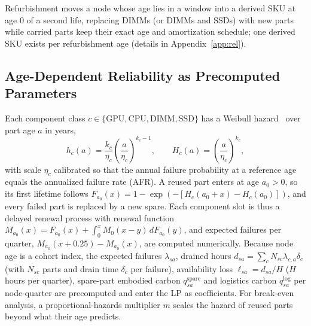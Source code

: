 \documentclass{article} %
\begin{document}
Refurbishment moves a node whose age lies in a window into a derived SKU at age 0 of a second life, replacing DIMMs (or DIMMs and SSDs) with new parts while carried parts keep their exact age and amortization schedule; one derived SKU exists per refurbishment age (details in Appendix~\ref{app:rel}).

\subsection{Age-Dependent Reliability as Precomputed Parameters}
\label{sec:method_rel}
Each component class $c \in \{\text{GPU}, \text{CPU}, \text{DIMM}, \text{SSD}\}$ has a Weibull hazard~\citep{Weibull1951StatisticalDistribution} over part age $a$ in years,
\begin{equation}
h_c(a) = \frac{k_c}{\eta_c}\left(\frac{a}{\eta_c}\right)^{k_c-1}, \qquad H_c(a) = \left(\frac{a}{\eta_c}\right)^{k_c},
\label{eq:weibull}
\end{equation}
with scale $\eta_c$ calibrated so that the annual failure probability at a reference age equals the annualized failure rate (AFR). A reused part enters at age $a_0>0$, so its first lifetime follows $F_{a_0}(x) = 1 - \exp(-[H_c(a_0+x) - H_c(a_0)])$, and every failed part is replaced by a new spare. Each component slot is thus a delayed renewal process with renewal function $M_{a_0}(x) = F_{a_0}(x) + \int_0^x M_0(x-y)\,dF_{a_0}(y)$, and expected failures per quarter, $M_{a_0}(x+0.25) - M_{a_0}(x)$, are computed numerically. Because node age is a cohort index, the expected failures $\lambda_{sa}$, drained hours $d_{sa} = \sum_c N_{sc}\lambda_{c,a}\delta_c$ (with $N_{sc}$ parts and drain time $\delta_c$ per failure), availability loss $\ell_{sa} = d_{sa}/H$ ($H$ hours per quarter), spare-part embodied carbon $q^{\text{spare}}_{sa}$ and logistics carbon $q^{\text{log}}_{sa}$ per node-quarter are precomputed and enter the LP as coefficients. For break-even analysis, a proportional-hazards multiplier $m$ scales the hazard of reused parts beyond what their age predicts.
\end{document}
